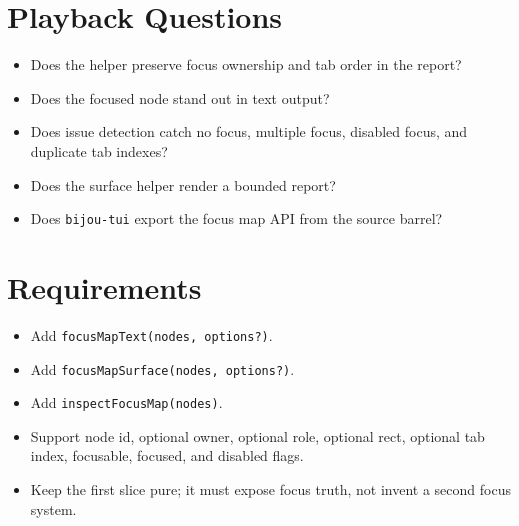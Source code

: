\section{Playback Questions}\label{record-257-playback-questions}

\begin{itemize}
\tightlist
\item
  Does the helper preserve focus ownership and tab order in the report?
\item
  Does the focused node stand out in text output?
\item
  Does issue detection catch no focus, multiple focus, disabled focus, and duplicate tab indexes?
\item
  Does the surface helper render a bounded report?
\item
  Does \texttt{b\allowbreak{}i\allowbreak{}j\allowbreak{}o\allowbreak{}u\allowbreak{}-\allowbreak{}t\allowbreak{}u\allowbreak{}i} export the focus map API from the source barrel?
\end{itemize}

\section{Requirements}\label{record-257-requirements}

\begin{itemize}
\tightlist
\item
  Add \texttt{f\allowbreak{}o\allowbreak{}c\allowbreak{}u\allowbreak{}s\allowbreak{}M\allowbreak{}a\allowbreak{}p\allowbreak{}T\allowbreak{}e\allowbreak{}x\allowbreak{}t\allowbreak{}(\allowbreak{}n\allowbreak{}o\allowbreak{}d\allowbreak{}e\allowbreak{}s\allowbreak{},\allowbreak{} \allowbreak{}o\allowbreak{}p\allowbreak{}t\allowbreak{}i\allowbreak{}o\allowbreak{}n\allowbreak{}s\allowbreak{}?\allowbreak{})}.
\item
  Add \texttt{f\allowbreak{}o\allowbreak{}c\allowbreak{}u\allowbreak{}s\allowbreak{}M\allowbreak{}a\allowbreak{}p\allowbreak{}S\allowbreak{}u\allowbreak{}r\allowbreak{}f\allowbreak{}a\allowbreak{}c\allowbreak{}e\allowbreak{}(\allowbreak{}n\allowbreak{}o\allowbreak{}d\allowbreak{}e\allowbreak{}s\allowbreak{},\allowbreak{} \allowbreak{}o\allowbreak{}p\allowbreak{}t\allowbreak{}i\allowbreak{}o\allowbreak{}n\allowbreak{}s\allowbreak{}?\allowbreak{})}.
\item
  Add \texttt{i\allowbreak{}n\allowbreak{}s\allowbreak{}p\allowbreak{}e\allowbreak{}c\allowbreak{}t\allowbreak{}F\allowbreak{}o\allowbreak{}c\allowbreak{}u\allowbreak{}s\allowbreak{}M\allowbreak{}a\allowbreak{}p\allowbreak{}(\allowbreak{}n\allowbreak{}o\allowbreak{}d\allowbreak{}e\allowbreak{}s\allowbreak{})}.
\item
  Support node id, optional owner, optional role, optional rect, optional tab index, focusable, focused, and disabled flags.
\item
  Keep the first slice pure; it must expose focus truth, not invent a second focus system.
\end{itemize}

